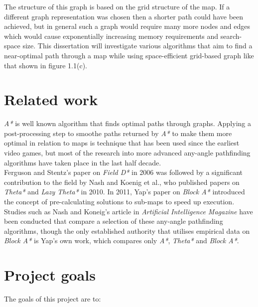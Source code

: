 \documentclass[12pt,notitlepage]{report}
\begin{document}
\noindent
The structure of this graph is based on the grid structure of the map. If a different graph representation was chosen then a shorter path could have been achieved, but in general such a graph would require many more nodes and edges which would cause exponentially increasing memory requirements and search-space size. This dissertation will investigate various algorithms that aim to find a near-optimal path through a map while using space-efficient grid-based graph like that shown in figure 1.1(c).\\

\section{Related work}

{\em A*} is well known algorithm that finds optimal paths through graphs. Applying a post-processing step to smoothe paths returned by {\em A*} to make them more optimal in relation to maps is technique that has been used since the earliest video games\cite{Thorpe84}, but most of the research into more advanced any-angle pathfinding algorithms have taken place in the last half decade. \\

\noindent
Ferguson and Stentz's paper on {\em Field D*}\cite{FergusonStentz06} in 2006 was followed by a significant contribution to the field by Nash and Koenig et al., who published papers on {\em Theta*}\cite{Daniel10} and {\em Lazy Theta*}\cite{Nash10} in 2010. In 2011, Yap's paper on {\em Block A*}\cite{Yap11} introduced the concept of pre-calculating solutions to sub-maps to speed up execution.\\

\noindent
Studies such as Nash and Koneig's article in {\em Artificial Intelligence Magazine}\cite{Nash11} have been conducted that compare a selection of these any-angle pathfinding algorithms, though the only established authority that utilises empirical data on {\em Block A*} is Yap's own work\cite{Yap11}, which compares only {\em A*}, {\em Theta*} and {\em Block A*}.

\section {Project goals}


\noindent
The goals of this project are to:
\end{document}
